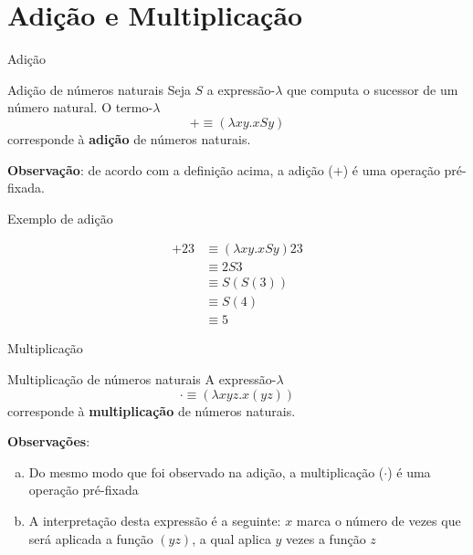 \section{Adição e Multiplicação}

\begin{frame}[fragile]{Adição}

    \begin{block}{Adição de números naturais}
        Seja $S$ a expressão-$\lambda$ que computa o sucessor de um número natural. O 
        termo-$\lambda$
        \[
            + \equiv (\lambda xy.xSy)
        \]
        corresponde à \textbf{adição} de números naturais.
    \end{block}

    \vspace{0.1in}

    \textbf{Observação}: de acordo com a definição acima, a adição ($+$) é uma operação
    pré-fixada.
\end{frame}

\begin{frame}[fragile]{Exemplo de adição}

    \begin{align*}
        +23 &\equiv (\lambda xy.xSy)23 \\
        &\equiv 2S3 \\
        &\equiv S(S(3)) \\
        &\equiv S(4) \\
        &\equiv 5
    \end{align*}

\end{frame}

\begin{frame}[fragile]{Multiplicação}

    \begin{block}{Multiplicação de números naturais}
        A expressão-$\lambda$
        \[
            \cdot \equiv (\lambda xyz.x(yz))
        \]
        corresponde à \textbf{multiplicação} de números naturais.
    \end{block}

    \vspace{0.1in}

    \textbf{Observações}:
    \begin{enumerate}[(a)]
        \item Do mesmo modo que foi observado na adição, a multiplicação ($\cdot$) é uma operação 
            pré-fixada
        \item A interpretação desta expressão é a seguinte: $x$ marca o número de vezes que
            será aplicada a função $(yz)$, a qual aplica $y$ vezes a função $z$
    \end{enumerate}
\end{frame}

